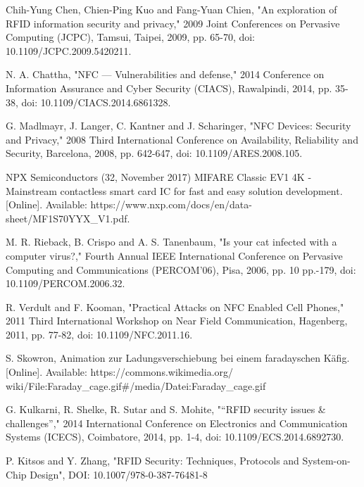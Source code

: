 \documentclass[conference]{IEEEtran}
\begin{document}
\begin{thebibliography}{00}
 Chih-Yung Chen, Chien-Ping Kuo and Fang-Yuan Chien, "An exploration of RFID information security and privacy," 2009 Joint Conferences on Pervasive Computing (JCPC), Tamsui, Taipei, 2009, pp. 65-70, doi: 10.1109/JCPC.2009.5420211.

 N. A. Chattha, "NFC — Vulnerabilities and defense," 2014 Conference on Information Assurance and Cyber Security (CIACS), Rawalpindi, 2014, pp. 35-38, doi: 10.1109/CIACS.2014.6861328.

 G. Madlmayr, J. Langer, C. Kantner and J. Scharinger, "NFC Devices: Security and Privacy," 2008 Third International Conference on Availability, Reliability and Security, Barcelona, 2008, pp. 642-647, doi: 10.1109/ARES.2008.105.

 NPX Semiconductors (32, November 2017) MIFARE Classic EV1 4K - Mainstream contactless smart card IC for fast and easy solution development. [Online]. Available: https://www.nxp.com/docs/en/data-sheet/MF1S70YYX\_V1.pdf.

 M. R. Rieback, B. Crispo and A. S. Tanenbaum, "Is your cat infected with a computer virus?," Fourth Annual IEEE International Conference on Pervasive Computing and Communications (PERCOM'06), Pisa, 2006, pp. 10 pp.-179, doi: 10.1109/PERCOM.2006.32.

 R. Verdult and F. Kooman, "Practical Attacks on NFC Enabled Cell Phones," 2011 Third International Workshop on Near Field Communication, Hagenberg, 2011, pp. 77-82, doi: 10.1109/NFC.2011.16.

 S. Skowron, Animation zur Ladungsverschiebung bei einem faradayschen Käfig. [Online]. Available: https://commons.wikimedia.org/ wiki/File:Faraday\_cage.gif\#/media/Datei:Faraday\_cage.gif

 G. Kulkarni, R. Shelke, R. Sutar and S. Mohite, "“RFID security issues \& challenges”," 2014 International Conference on Electronics and Communication Systems (ICECS), Coimbatore, 2014, pp. 1-4, doi: 10.1109/ECS.2014.6892730.

 P. Kitsos and Y. Zhang, "RFID Security: Techniques, Protocols and System-on-Chip Design", DOI: 10.1007/978-0-387-76481-8

\end{thebibliography}
\end{document}
